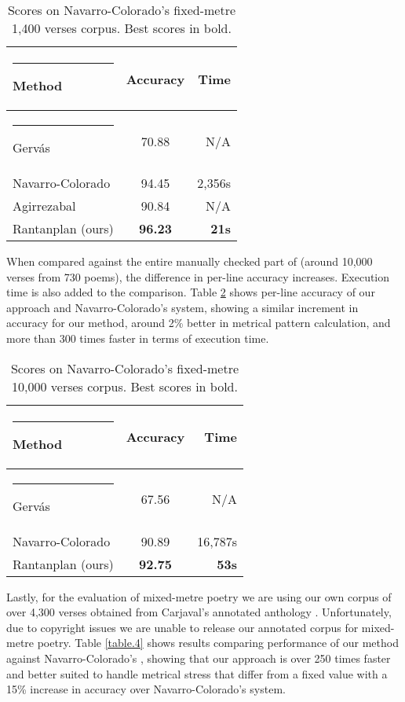 \documentclass[a4paper,11pt,twocolumn,twoside]{article}
\begin{document}
\begin{table} [htbp]
\begin{center}
\begin{tabular} {lcr}
  \hline\rule{-2pt}{15pt}
  {\bf Method} & {\bf Accuracy} & {\bf Time}\\
  \hline\rule{-4pt}{10pt}
Gervás\footnotemark & 70.88 & N/A \\
Navarro-Colorado & 94.45 & 2,356s \\
Agirrezabal & 90.84 & N/A\\
Rantanplan (ours) & \textbf{96.23} & \textbf{21s} \\
\hline
\end{tabular}
\end{center}
\caption{\label{table.2}Scores on Navarro-Colorado's fixed-metre 1,400 verses corpus. Best scores in bold.}
\end{table}

When compared against the entire manually checked part of \cite{navarro2016metrical} (around 10,000 verses from 730 poems), the difference in per-line accuracy increases. Execution time is also added to the comparison. Table \ref{table.3} shows per-line accuracy of our approach and Navarro-Colorado's system, showing a similar increment in accuracy for our method, around 2\% better in metrical pattern calculation, and more than 300 times faster in terms of execution time.

\begin{table} [htbp]
\begin{center}
\begin{tabular} {lcr}
  \hline\rule{-2pt}{15pt}
  {\bf Method} & {\bf Accuracy} & {\bf Time}\\
  \hline\rule{-4pt}{10pt}
Gervás\footnotemark & 67.56 & N/A \\
Navarro-Colorado & 90.89 & 16,787s \\
Rantanplan (ours) & \textbf{92.75} & \textbf{53s}\\
\hline
\end{tabular}
\end{center}
\caption{\label{table.3}Scores on Navarro-Colorado's fixed-metre 10,000 verses corpus. Best scores in bold.}
\end{table}

Lastly, for the evaluation of mixed-metre poetry we are using our own corpus of over 4,300 verses obtained from Carjaval's annotated anthology \cite{fernandez2003antologia}. Unfortunately, due to copyright issues we are unable to release our annotated corpus for mixed-metre poetry. Table \ref{table.4} shows results comparing performance of our method against Navarro-Colorado's \cite{navarro2017metrical}, showing that our approach is over 250 times faster and better suited to handle metrical stress that differ from a fixed value with a 15\% increase in accuracy over Navarro-Colorado's system.
\end{document}
